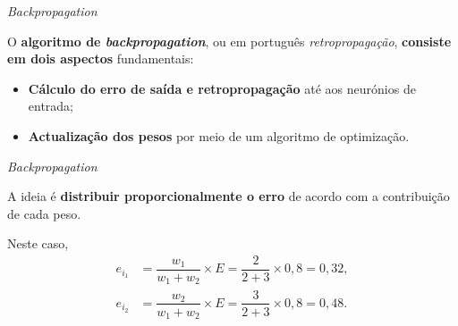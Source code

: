 \begin{frame}{\textit{Backpropagation}}
    
    O \textbf{algoritmo de \textit{backpropagation}}, ou em português \textit{retropropagação}, \textbf{consiste em dois aspectos} fundamentais:
    \begin{itemize}
        \item \textbf{Cálculo do erro de saída e retropropagação} até aos neurónios de entrada;
        \medskip
        \item \textbf{Actualização dos pesos} por meio de um algoritmo de optimização. 
    \end{itemize}
    
    \pauseskip
    
    

\end{frame}

\begin{frame}{\textit{Backpropagation} \cont}
    
    
    \medskip

    \begin{figure}
        \centering
        
    \end{figure}
    
    A ideia é \textbf{distribuir proporcionalmente o erro} de acordo com a contribuição de cada peso.
    
    \pauseskip
    
    Neste caso,
    \begin{equation}
        \begin{split}
            e_{i_1} &= \dfrac{w_1}{w_1 + w_2} \times E = \dfrac{2}{2+3}\times0,8 = 0,32, \\
            e_{i_2} &= \dfrac{w_2}{w_1 + w_2} \times E = \dfrac{3}{2+3}\times0,8 = 0,48. \\
        \end{split}
    \end{equation}
    
\end{frame}

